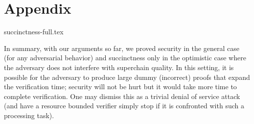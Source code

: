 \appendix
\section*{Appendix}

%
%
%
%
%
%



{succinctness-full.tex}

In summary, with our arguments so far,  we proved security in the general case
(for any adversarial behavior)  and succinctness only in the optimistic case
where the adversary does not interfere with superchain quality. In this setting,
it is possible for the adversary to produce large dummy (incorrect) proofs that
expand the verification time; security will not be hurt but it would take more
time to complete verification. One may dismiss this as a trivial denial of
service attack (and have a resource bounded verifier simply stop  if it is
confronted with such a processing task).


